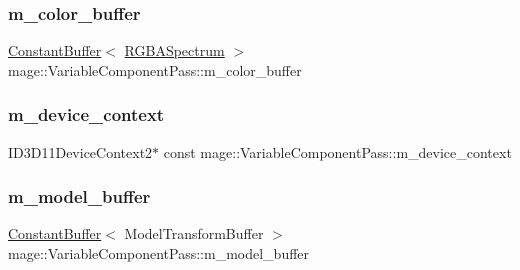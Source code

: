 \subsubsection{\texorpdfstring{m\+\_\+color\+\_\+buffer}{m\_color\_buffer}}
{\footnotesize\ttfamily \hyperlink{structmage_1_1_constant_buffer}{Constant\+Buffer}$<$ \hyperlink{structmage_1_1_r_g_b_a_spectrum}{R\+G\+B\+A\+Spectrum} $>$ mage\+::\+Variable\+Component\+Pass\+::m\+\_\+color\+\_\+buffer\hspace{0.3cm}{\ttfamily [private]}}

\hypertarget{classmage_1_1_variable_component_pass_a12a0f59a371c46377af9032744a6e71b}{}\label{classmage_1_1_variable_component_pass_a12a0f59a371c46377af9032744a6e71b} 
\subsubsection{\texorpdfstring{m\+\_\+device\+\_\+context}{m\_device\_context}}
{\footnotesize\ttfamily I\+D3\+D11\+Device\+Context2$\ast$ const mage\+::\+Variable\+Component\+Pass\+::m\+\_\+device\+\_\+context\hspace{0.3cm}{\ttfamily [private]}}

\hypertarget{classmage_1_1_variable_component_pass_a3313fa671047d02a9c9b85fea85f545d}{}\label{classmage_1_1_variable_component_pass_a3313fa671047d02a9c9b85fea85f545d} 
\subsubsection{\texorpdfstring{m\+\_\+model\+\_\+buffer}{m\_model\_buffer}}
{\footnotesize\ttfamily \hyperlink{structmage_1_1_constant_buffer}{Constant\+Buffer}$<$ Model\+Transform\+Buffer $>$ mage\+::\+Variable\+Component\+Pass\+::m\+\_\+model\+\_\+buffer\hspace{0.3cm}{\ttfamily [private]}}

\hypertarget{classmage_1_1_variable_component_pass_a20d7e3c6b663544b84871f519284db2c}{}\label{classmage_1_1_variable_component_pass_a20d7e3c6b663544b84871f519284db2c} 
